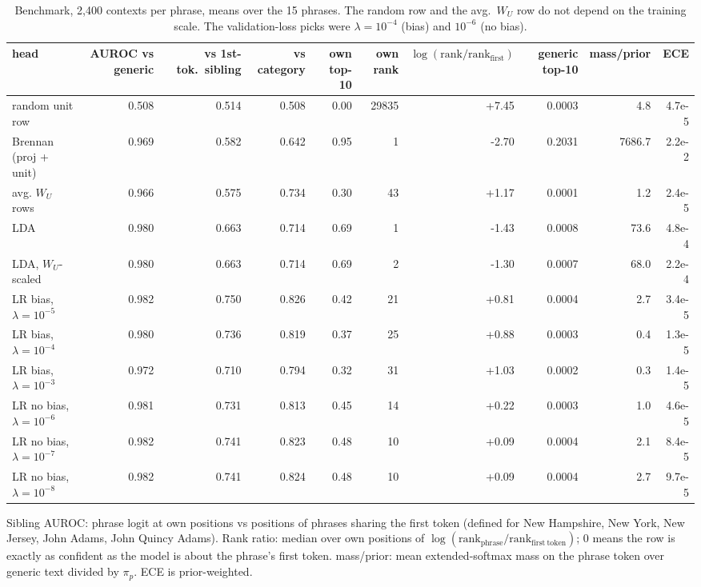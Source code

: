 \begin{table}[t]
\centering
\footnotesize
\caption{Benchmark, 2{,}400 contexts per phrase, means over the 15 phrases. The random row and the avg.\ $W_U$ row do not depend on the training scale. The validation-loss picks were $\lambda{=}10^{-4}$ (bias) and $10^{-6}$ (no bias).}
\label{tab:bench_headline}
\begin{adjustbox}{max width=\textwidth}
\begin{tabular}{lrrrrrrrrr}
\toprule
head & AUROC vs generic & vs 1st-tok.\ sibling & vs category & own top-10 & own rank & $\log(\mathrm{rank}/\mathrm{rank}_{\mathrm{first}})$ & generic top-10 & mass/prior & ECE \\
\midrule
random unit row & 0.508 & 0.514 & 0.508 & 0.00 & 29835 & +7.45 & 0.0003 & 4.8 & 4.7e-5 \\
Brennan (proj + unit) & 0.969 & 0.582 & 0.642 & 0.95 & 1 & -2.70 & 0.2031 & 7686.7 & 2.2e-2 \\
avg. $W_U$ rows & 0.966 & 0.575 & 0.734 & 0.30 & 43 & +1.17 & 0.0001 & 1.2 & 2.4e-5 \\
LDA & 0.980 & 0.663 & 0.714 & 0.69 & 1 & -1.43 & 0.0008 & 73.6 & 4.8e-4 \\
LDA, $W_U$-scaled & 0.980 & 0.663 & 0.714 & 0.69 & 2 & -1.30 & 0.0007 & 68.0 & 2.2e-4 \\
\midrule
LR bias, $\lambda{=}10^{-5}$ & 0.982 & 0.750 & 0.826 & 0.42 & 21 & +0.81 & 0.0004 & 2.7 & 3.4e-5 \\
LR bias, $\lambda{=}10^{-4}$ & 0.980 & 0.736 & 0.819 & 0.37 & 25 & +0.88 & 0.0003 & 0.4 & 1.3e-5 \\
LR bias, $\lambda{=}10^{-3}$ & 0.972 & 0.710 & 0.794 & 0.32 & 31 & +1.03 & 0.0002 & 0.3 & 1.4e-5 \\
\midrule
LR no bias, $\lambda{=}10^{-6}$ & 0.981 & 0.731 & 0.813 & 0.45 & 14 & +0.22 & 0.0003 & 1.0 & 4.6e-5 \\
LR no bias, $\lambda{=}10^{-7}$ & 0.982 & 0.741 & 0.823 & 0.48 & 10 & +0.09 & 0.0004 & 2.1 & 8.4e-5 \\
LR no bias, $\lambda{=}10^{-8}$ & 0.982 & 0.741 & 0.824 & 0.48 & 10 & +0.09 & 0.0004 & 2.7 & 9.7e-5 \\
\bottomrule
\end{tabular}
\end{adjustbox}
\par\smallskip\begin{minipage}{\textwidth}\footnotesize Sibling AUROC: phrase logit at own positions vs positions of phrases sharing the first token (defined for New Hampshire, New York, New Jersey, John Adams, John Quincy Adams). Rank ratio: median over own positions of $\log(\mathrm{rank}_{\mathrm{phrase}}/\mathrm{rank}_{\mathrm{first\ token}})$; $0$ means the row is exactly as confident as the model is about the phrase's first token. mass/prior: mean extended-softmax mass on the phrase token over generic text divided by $\pi_p$. ECE is prior-weighted.\end{minipage}
\end{table}